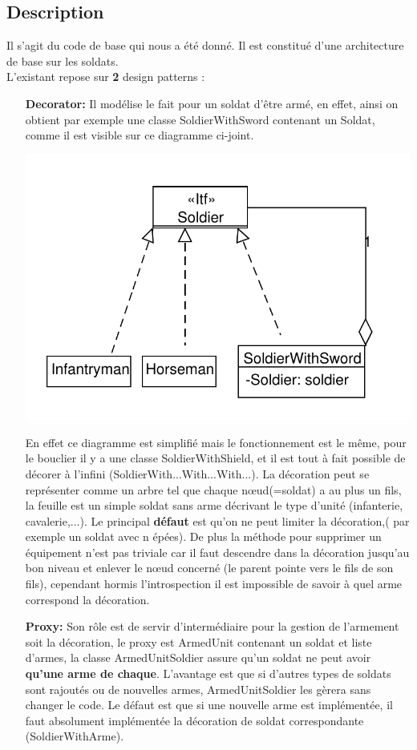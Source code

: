 \documentclass[12pt]{article}
\begin{document}
\subsection{Description}
Il s'agit du code de base qui nous a été donné. Il est constitué d'une architecture de base sur les soldats.\\
L'existant repose sur \textbf{2} design patterns :
\begin{enumerate}
\item[\textbf{Decorator:}] Il modélise le fait pour un soldat d'être armé,
en effet, ainsi on obtient par exemple une classe SoldierWithSword contenant un Soldat, comme il est visible sur ce diagramme ci-joint.

\includegraphics[scale=1]{../UML/Realdecorator}

En effet ce diagramme est simplifié mais le fonctionnement est le même,
pour le bouclier il y a une classe SoldierWithShield, et il est tout à fait 
possible de décorer à l'infini (SoldierWith...With...With...).
La décoration peut se représenter comme un arbre tel que chaque nœud(=soldat) a au plus un fils, la feuille est un simple soldat sans arme décrivant le type d'unité
(infanterie, cavalerie,...).
Le principal \textbf{défaut} est qu'on ne peut limiter la décoration,( par exemple un soldat avec n épées). De plus la méthode pour supprimer un équipement n'est pas triviale car il faut descendre dans la décoration jusqu'au bon niveau et enlever
le nœud concerné (le parent pointe vers le fils de son fils), cependant
hormis l'introspection il est impossible de savoir à quel arme correspond la décoration.

\item[\textbf{Proxy:}] Son rôle est de servir d'intermédiaire pour la gestion de
l'armement soit la décoration, le proxy est ArmedUnit contenant un soldat et
liste d'armes, la classe ArmedUnitSoldier assure qu'un soldat ne peut avoir
\textbf{qu'une arme de chaque}. L'avantage est que si d'autres types de soldats
sont rajoutés ou de nouvelles armes, ArmedUnitSoldier les gèrera sans changer le 
code. Le défaut est que si une nouvelle arme est implémentée, il faut absolument
implémentée la décoration de soldat correspondante (SoldierWith{Arme}).


\end{enumerate}
\end{document}
